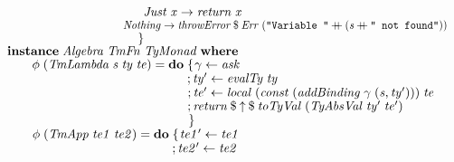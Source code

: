 \documentclass[10pt]{article}
\newcommand{\Conid}[1]{\mathit{#1}}
\newcommand{\Varid}[1]{\mathit{#1}}
\newcommand{\plus}{\mathbin{+\!\!\!+}}
\begin{document}
\begin{tabbing}
${\hskip1.00em\relax\hskip2.00em\relax\phantom{\Varid{\phi}\;(\Conid{TmVar}\;\Varid{s})\mathrel{=}\mathbf{do}\;\mbox{}}\phantom{;\mbox{}}\Conid{Just}\;\Varid{x}\to \Varid{return}\;\Varid{x}}$\\
${\hskip1.00em\relax\hskip2.00em\relax\phantom{\Varid{\phi}\;(\Conid{TmVar}\;\Varid{s})\mathrel{=}\mathbf{do}\;\mbox{}}\phantom{;\mbox{}}\Conid{Nothing}\to \Varid{throwError}\mathbin{\$}\Conid{Err}\;(\text{\tt \char34 Variable~\char34}\plus (\Varid{s}\plus \text{\tt \char34 ~not~found\char34}))}$\\
${\hskip1.00em\relax\hskip2.00em\relax\phantom{\Varid{\phi}\;(\Conid{TmVar}\;\Varid{s})\mathrel{=}\mathbf{do}\;\mbox{}}\mskip1.5mu\}}$\\
${}$\\
${\hskip1.00em\relax\mathbf{instance}\;\Conid{Algebra}\;\Conid{TmFn}\;\Conid{TyMonad}\;\mathbf{where}}$\\
${\hskip1.00em\relax\hskip2.00em\relax\Varid{\phi}\;(\Conid{TmLambda}\;\Varid{s}\;\Varid{ty}\;\Varid{te})\mathrel{=}\mathbf{do}\;\{\mskip1.5mu \Varid{\gamma}\leftarrow \Varid{ask}}$\\
${\hskip1.00em\relax\hskip2.00em\relax\phantom{\Varid{\phi}\;(\Conid{TmLambda}\;\Varid{s}\;\Varid{ty}\;\Varid{te})\mathrel{=}\mathbf{do}\;\mbox{}};\Varid{ty'}\leftarrow \Varid{evalTy}\;\Varid{ty}}$\\
${\hskip1.00em\relax\hskip2.00em\relax\phantom{\Varid{\phi}\;(\Conid{TmLambda}\;\Varid{s}\;\Varid{ty}\;\Varid{te})\mathrel{=}\mathbf{do}\;\mbox{}};\Varid{te'}\leftarrow \Varid{local}\;(\Varid{const}\;(\Varid{addBinding}\;\Varid{\gamma}\;(\Varid{s},\Varid{ty'})))\;\Varid{te}}$\\
${\hskip1.00em\relax\hskip2.00em\relax\phantom{\Varid{\phi}\;(\Conid{TmLambda}\;\Varid{s}\;\Varid{ty}\;\Varid{te})\mathrel{=}\mathbf{do}\;\mbox{}};\Varid{return}\mathbin{\$}\Varid{\uparrow}\mathbin{\$}\Varid{toTyVal}\;(\Conid{TyAbsVal}\;\Varid{ty'}\;\Varid{te'})}$\\
${\hskip1.00em\relax\hskip2.00em\relax\phantom{\Varid{\phi}\;(\Conid{TmLambda}\;\Varid{s}\;\Varid{ty}\;\Varid{te})\mathrel{=}\mathbf{do}\;\mbox{}}\mskip1.5mu\}}$\\
${}$\\
${\hskip1.00em\relax\hskip2.00em\relax\Varid{\phi}\;(\Conid{TmApp}\;\Varid{te1}\;\Varid{te2})\mathrel{=}\mathbf{do}\;\{\mskip1.5mu \Varid{te1'}\leftarrow \Varid{te1}}$\\
${\hskip1.00em\relax\hskip2.00em\relax\phantom{\Varid{\phi}\;(\Conid{TmApp}\;\Varid{te1}\;\Varid{te2})\mathrel{=}\mathbf{do}\;\mbox{}};\Varid{te2'}\leftarrow \Varid{te2}}$\\

\end{tabbing}
\end{document}
